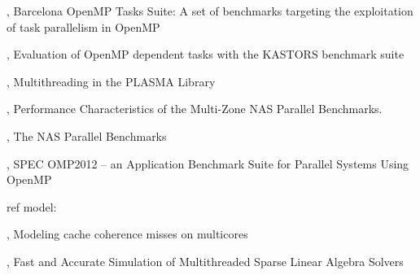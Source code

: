 \cite{Duran2009}, Barcelona OpenMP Tasks Suite: A set of benchmarks targeting the exploitation of task parallelism in OpenMP

\cite{Virouleau2014}, Evaluation of OpenMP dependent tasks with the KASTORS benchmark suite

\cite{Kurzak2013}, Multithreading in the PLASMA Library

\cite{Jin2004}, Performance Characteristics of the Multi-Zone NAS Parallel Benchmarks.

\cite{Bailey1994}, The NAS Parallel Benchmarks

\cite{Muller2012}, SPEC OMP2012 -- an Application Benchmark Suite for Parallel Systems Using OpenMP


ref model:

\cite{Pan2014}, Modeling cache coherence misses on multicores

\cite{Stanisic2016}, Fast and Accurate Simulation of Multithreaded Sparse Linear Algebra Solvers




